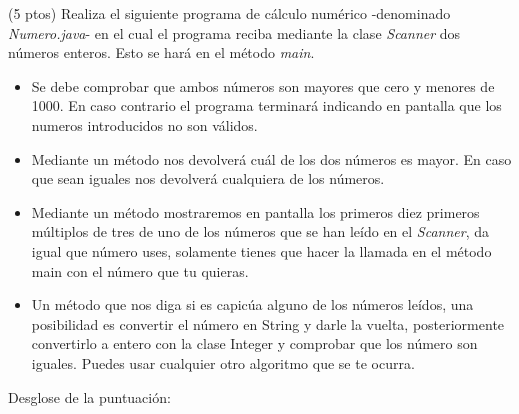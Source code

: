 \documentclass[addpoints,12pt]{exam}
\begin{document}
\begin{questions}
\question(5 ptos) Realiza el siguiente programa de cálculo numérico -denominado \emph{Numero.java}- en el cual el programa reciba mediante la clase \textit{Scanner} dos números enteros. Esto se hará en el método \emph{main}.
\begin{itemize}
\item Se debe comprobar que ambos números son mayores que cero y menores de 1000. En caso contrario el programa terminará indicando en pantalla que los numeros introducidos no son válidos.
\item Mediante un método nos devolverá cuál de los dos números es mayor. En caso que sean iguales nos devolverá cualquiera de los números.
\item Mediante un método mostraremos en pantalla los primeros diez primeros múltiplos de tres de uno de los números que se han leído en el \emph{Scanner}, da igual que número uses, solamente tienes que hacer la llamada en el método main con el número que tu quieras.
\item Un método que nos diga si es capicúa alguno de los números leídos, una posibilidad es convertir el número en String y darle la vuelta, posteriormente convertirlo a entero con la clase Integer y comprobar que los número son iguales. Puedes usar cualquier otro algoritmo que se te ocurra.
\end{itemize}
Desglose de la puntuación:
\end{questions}
\end{document}
